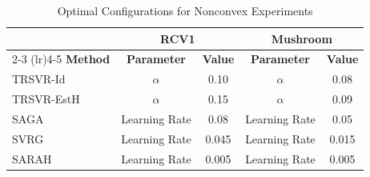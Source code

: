 \documentclass{article}
\theoremstyle{plain}
\theoremstyle{definition}
\theoremstyle{remark}
\begin{document}
\begin{table}[ht]
    \centering
    \caption{Optimal Configurations for Nonconvex Experiments}
    \label{tab:optimal_params}
    \begin{tabular}{lcccc}
        \toprule
        & \multicolumn{2}{c}{\textbf{RCV1}} & \multicolumn{2}{c}{\textbf{Mushroom}} \\
        \cmidrule(lr){2-3} \cmidrule(lr){4-5}
        \textbf{Method} & \textbf{Parameter} & \textbf{Value} & \textbf{Parameter} & \textbf{Value} \\
        \midrule
        TRSVR-Id & $\alpha$ & 0.10 & $\alpha$ & 0.08 \\
        TRSVR-EstH & $\alpha$ & 0.15 & $\alpha$ & 0.09 \\
        SAGA & Learning Rate & 0.08 & Learning Rate & 0.05 \\
        SVRG & Learning Rate & 0.045 & Learning Rate & 0.015 \\
        SARAH & Learning Rate & 0.005 & Learning Rate & 0.005 \\
        \bottomrule
    \end{tabular}
\end{table}
\end{document}
